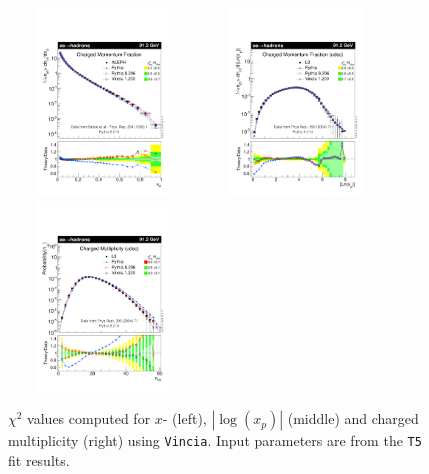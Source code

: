 \documentclass[aps,preprint,floatfix,nofootinbib,showpacs]{revtex4-1}
\begin{document}
   \begin{figure}[!h]
 \centering
 \includegraphics[width=5cm, height=5cm]{Vincia-T5/vincia03-x.pdf}
 \hfill
 \includegraphics[width=5cm, height=5cm]{Vincia-T5/vincia03-Lnx.pdf}
 \hfill
 \includegraphics[width=5cm, height=5cm]{Vincia-T5/vincia03-Nch.pdf}
 \caption{$\chi^2$ values computed for $x$- (left), $|\log(x_p)|$ (middle) and charged multiplicity (right) using
 \texttt{Vincia}. Input parameters are from the \texttt{T5} fit results.}
 \label{Chi2-5}
 \end{figure}
\end{document}
